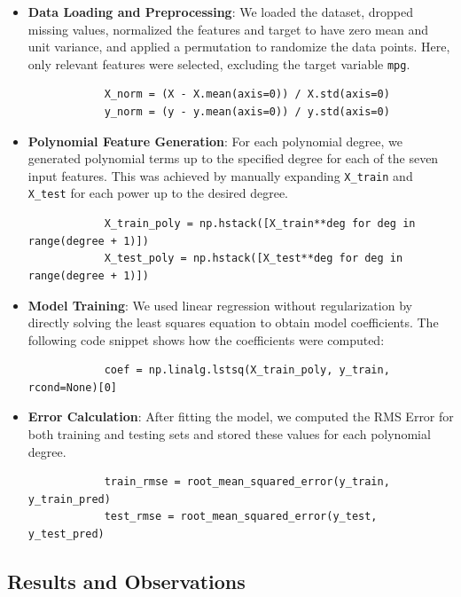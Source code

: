 \documentclass{article}
\begin{document}
	\begin{itemize}
		\item \textbf{Data Loading and Preprocessing}: We loaded the dataset, dropped missing values, normalized the features and target to have zero mean and unit variance, and applied a permutation to randomize the data points. Here, only relevant features were selected, excluding the target variable \texttt{mpg}.
		
		\begin{verbatim}
			X_norm = (X - X.mean(axis=0)) / X.std(axis=0)
			y_norm = (y - y.mean(axis=0)) / y.std(axis=0)
		\end{verbatim}
		
		\item \textbf{Polynomial Feature Generation}: For each polynomial degree, we generated polynomial terms up to the specified degree for each of the seven input features. This was achieved by manually expanding \texttt{X\_train} and \texttt{X\_test} for each power up to the desired degree.
		
		\begin{verbatim}
			X_train_poly = np.hstack([X_train**deg for deg in range(degree + 1)])  
			X_test_poly = np.hstack([X_test**deg for deg in range(degree + 1)])
		\end{verbatim}
		
		\item \textbf{Model Training}: We used linear regression without regularization by directly solving the least squares equation to obtain model coefficients. The following code snippet shows how the coefficients were computed:
		
		\begin{verbatim}
			coef = np.linalg.lstsq(X_train_poly, y_train, rcond=None)[0]
		\end{verbatim}
		
		\item \textbf{Error Calculation}: After fitting the model, we computed the RMS Error for both training and testing sets and stored these values for each polynomial degree.
		
		\begin{verbatim}
			train_rmse = root_mean_squared_error(y_train, y_train_pred)
			test_rmse = root_mean_squared_error(y_test, y_test_pred)
		\end{verbatim}
	\end{itemize}
	
	\subsection*{Results and Observations}
	
\end{document}
